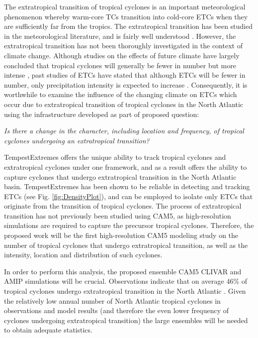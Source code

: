 \documentclass[11pt]{article}
\begin{document}
The extratropical transition of tropical cyclones is an important meteorological phenomenon whereby warm-core TCs transition into cold-core ETCs when they are sufficiently far from the tropics.  The extratropical transition has been studied in the meteorological literature, and is fairly well understood \citep{hart2001climatology}.  However, the extratropical transition has not been thoroughly investigated in the context of climate change.  Although studies on the effects of future climate have largely concluded that tropical cyclones will generally be fewer in number but more intense \citep{Knutson2010}, past studies of ETCs have stated that although ETCs will be fewer in number, only precipitation intensity is expected to increase \citep{bengtsson2009will}.  Consequently, it is worthwhile to examine the influence of the changing climate on ETCs which occur due to extratropical transition of tropical cyclones in the North Atlantic using the infrastructure developed as part of proposed question:

\emph{Is there a change in the character, including location and frequency, of tropical cyclones undergoing an extratropical transition?}

TempestExtremes offers the unique ability to track tropical cyclones and extratropical cyclones under one framework, and as a result offers the ability to capture cyclones that undergo extratropical transition in the North Atlantic basin.  TempestExtremes has been shown to be reliable in detecting and tracking ETCs (see Fig. \ref{fig:DensityPlot}), and can be employed to isolate only ETCs that originate from the transition of tropical cyclones. The process of extratropical transition has not previously been studied using CAM5, as high-resolution simulations are required to capture the precursor tropical cyclones. Therefore, the proposed work will be the first high-resolution CAM5 modeling study on the number of tropical cyclones that undergo extratropical transition, as well as the intensity, location and distribution of such cyclones.  

In order to perform this analysis, the proposed ensemble CAM5 CLIVAR and AMIP simulations will be crucial.  Observations indicate that on average 46$\%$ of tropical cyclones undergo extratropical transition in the North Atlantic \citep{hart2001climatology}. Given the relatively low annual number of North Atlantic tropical cyclones in observations and model results (and therefore the even lower frequency of cyclones undergoing extratropical transition) the large ensembles will be needed to obtain adequate statistics.
\end{document}
